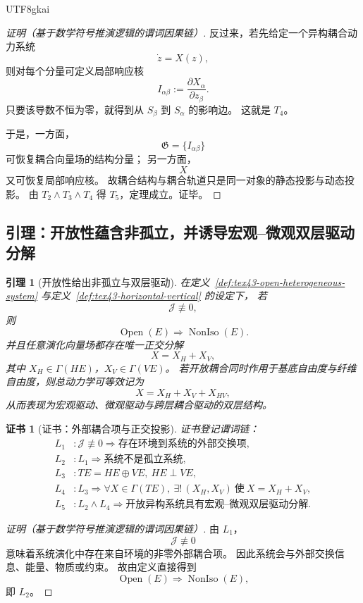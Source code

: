 \documentclass[12pt]{article}
\newtheorem{lemma}{引理}[section]
\newtheorem{Certificate}{证书}[section]
\newcommand{\Open}{\operatorname{Open}}
\newcommand{\NonIso}{\operatorname{NonIso}}
\begin{document}
\begin{CJK*}{UTF8}{gkai}
\begin{proof}[证明（基于数学符号推演逻辑的谓词因果链）]
反过来，若先给定一个异构耦合动力系统
\[
  \dot z = X(z),
\]
则对每个分量可定义局部响应核
\[
  I_{\alpha\beta}
  :=
  \frac{\partial X_\alpha}{\partial z_\beta}.
\]
只要该导数不恒为零，就得到从 $S_\beta$ 到 $S_\alpha$ 的影响边。
这就是 $T_4$。

于是，一方面，
\[
  \mathfrak G=\{I_{\alpha\beta}\}
\]
可恢复耦合向量场的结构分量；
另一方面，
\[
  X
\]
又可恢复局部响应核。
故耦合结构与耦合轨道只是同一对象的静态投影与动态投影。
由 $T_2\wedge T_3\wedge T_4$ 得 $T_5$，定理成立。证毕。
\end{proof}

\subsection{引理：开放性蕴含非孤立，并诱导宏观--微观双层驱动分解}
\label{subsec:tex43-lemma}

\begin{lemma}[开放性给出非孤立与双层驱动]
\label{lem:tex43-open-nonisolate}
在定义~\ref{def:tex43-open-heterogeneous-system} 与定义~\ref{def:tex43-horizontal-vertical} 的设定下，
若
\[
  \mathcal J\not\equiv 0,
\]
则
\[
  \Open(E)\Rightarrow \NonIso(E).
\]
并且任意演化向量场都存在唯一正交分解
\[
  X=X_H+X_V,
\]
其中 $X_H\in \Gamma(HE)$，$X_V\in \Gamma(VE)$。
若开放耦合同时作用于基底自由度与纤维自由度，则总动力学可等效记为
\[
  X=X_H+X_V+X_{HV},
\]
从而表现为宏观驱动、微观驱动与跨层耦合驱动的双层结构。
\end{lemma}

\begin{Certificate}[证书：外部耦合项与正交投影]
\label{cert:tex43-open-nonisolate}
证书登记谓词链：
\[
\begin{aligned}
  L_1 &: \mathcal J\not\equiv 0 \Rightarrow \text{存在环境到系统的外部交换项},\\
  L_2 &: L_1 \Rightarrow \text{系统不是孤立系统},\\
  L_3 &: TE=HE\oplus VE,\ HE\perp VE,\\
  L_4 &: L_3 \Rightarrow \forall X\in\Gamma(TE),\ \exists!\,(X_H,X_V)\ \text{使}\ X=X_H+X_V,\\
  L_5 &: L_2\wedge L_4 \Rightarrow \text{开放异构系统具有宏观--微观双层驱动分解}.
\end{aligned}
\]
\end{Certificate}

\begin{proof}[证明（基于数学符号推演逻辑的谓词因果链）]
由 $L_1$，
\[
  \mathcal J\not\equiv 0
\]
意味着系统演化中存在来自环境的非零外部耦合项。
因此系统会与外部交换信息、能量、物质或约束。
故由定义直接得到
\[
  \Open(E)\Rightarrow \NonIso(E),
\]
即 $L_2$。


\end{proof}
\end{CJK*}
\end{document}
